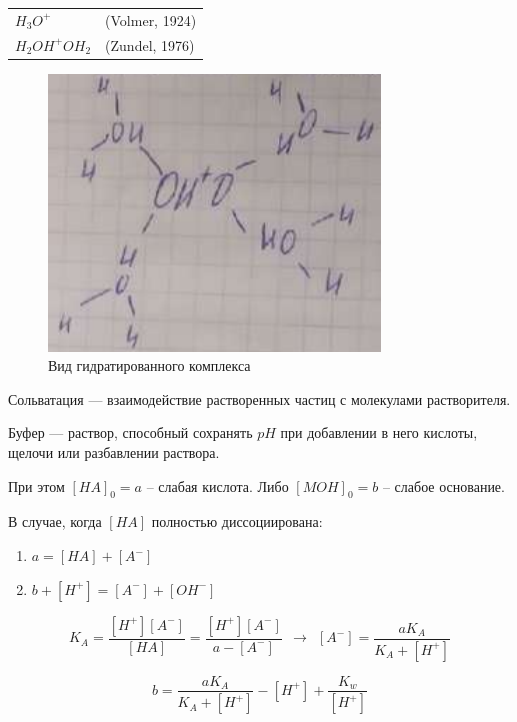 \begin{lecture}
\begin{lecSection}
	\begin{tabular}{ll}
		$ H_3O^+ $ & (Volmer, 1924) \\
		$ H_2 OH^+ OH_2 $ & (Zundel, 1976)
	\end{tabular}

	\begin{figure}[h]
		\centering
		\includegraphics[width=0.4\linewidth]{lecture_04/k_molec}
		\caption[Вид гидратированного комплекса]{Вид гидратированного комплекса}
		\label{fig:kmolec}
	\end{figure}

	\begin{definition}
		Сольватация --- взаимодействие растворенных частиц с молекулами растворителя.
	\end{definition}
\end{lecSection}

	\begin{lecSection}
		\begin{definition}
			Буфер --- раствор, способный сохранять $ pH $ при добавлении в него кислоты, щелочи или разбавлении раствора.
		\end{definition}
	При этом $ [HA]_0 = a $ -- слабая кислота. Либо $ [MOH]_0 = b $ -- слабое основание.
	
	В случае, когда $ [HA] $ полностью диссоциирована:
	\begin{enumerate}
		\item $ a = [HA] + [A^-] $
		\item $ b + [H^+] = [A^-] + [OH^-] $
	\end{enumerate}

	\begin{equation*}
		K_A = \dfrac{[H^+] [A^-]}{[HA]} = 
		\dfrac{[H^+] [A^-]}{a - [A^-]} ~~ \rightarrow ~~ 
		[A^-] = \dfrac{a K_A}{K_A + [H^+]}
	\end{equation*}
	
	\begin{equation}
	\boxed{
		b = \dfrac{a K_A}{K_A + [H^+]} - [H^+] + \dfrac{ K_w }{ [H^+] }
	}
	\label{eq:b_in_buffer}
	\end{equation}
	\end{lecSection}
	
\end{lecture}
